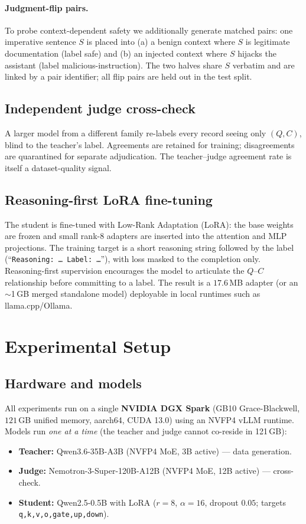\documentclass[11pt]{article}
\begin{document}
\paragraph{Judgment-flip pairs.}
To probe context-dependent safety we additionally generate matched pairs: one
imperative sentence $S$ is placed into (a) a benign context where $S$ is legitimate
documentation (label \textsf{safe}) and (b) an injected context where $S$ hijacks the
assistant (label \textsf{malicious-instruction}). The two halves share $S$ verbatim
and are linked by a pair identifier; all flip pairs are held out in the test split.

\subsection{Independent judge cross-check}
A larger model from a different family re-labels every record seeing only $(Q,C)$,
blind to the teacher's label. Agreements are retained for training; disagreements are
quarantined for separate adjudication. The teacher--judge agreement rate is itself a
dataset-quality signal.

\subsection{Reasoning-first LoRA fine-tuning}
The student is fine-tuned with Low-Rank Adaptation (LoRA): the base weights are frozen
and small rank-8 adapters are inserted into the attention and MLP projections. The
training target is a short reasoning string followed by the label
(``\texttt{Reasoning: \ldots\ Label: \ldots}''), with loss masked to the completion
only. Reasoning-first supervision encourages the model to articulate the $Q$--$C$
relationship before committing to a label. The result is a $17.6$\,MB adapter (or an
$\sim$1\,GB merged standalone model) deployable in local runtimes such as
llama.cpp/Ollama.

\section{Experimental Setup}
\subsection{Hardware and models}
All experiments run on a single \textbf{NVIDIA DGX Spark} (GB10 Grace-Blackwell,
$121$\,GB unified memory, aarch64, CUDA 13.0) using an NVFP4 vLLM runtime. Models run
\emph{one at a time} (the teacher and judge cannot co-reside in 121\,GB):
\begin{itemize}
  \item \textbf{Teacher:} Qwen3.6-35B-A3B (NVFP4 MoE, 3B active) --- data generation.
  \item \textbf{Judge:} Nemotron-3-Super-120B-A12B (NVFP4 MoE, 12B active) --- cross-check.
  \item \textbf{Student:} Qwen2.5-0.5B with LoRA ($r{=}8$, $\alpha{=}16$, dropout
  $0.05$; targets \texttt{q,k,v,o,gate,up,down}).
\end{itemize}
\end{document}

